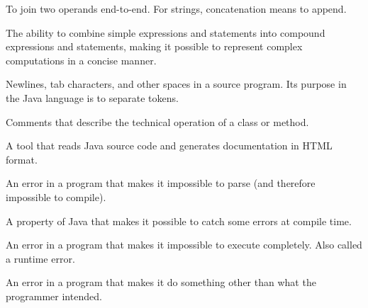 \begin{description}
To join two operands end-to-end.
For strings, concatenation means to append.

The ability to combine simple expressions and statements into compound expressions and statements, making it possible to represent complex computations in a concise manner.

Newlines, tab characters, and other spaces in a source program.
Its purpose in the Java language is to separate tokens.

Comments that describe the technical operation of a class or method.

A tool that reads Java source code and generates documentation in HTML format.

An error in a program that makes it impossible to parse (and therefore impossible to compile).

A property of Java that makes it possible to catch some errors at compile time.

An error in a program that makes it impossible to execute completely.
Also called a runtime error.

An error in a program that makes it do something other than what the programmer intended.

\end{description}
